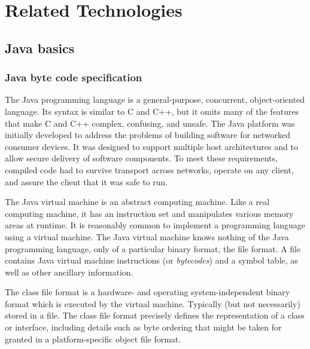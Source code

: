 \chapter{Related Technologies}


\section{Java basics}

\subsection{Java byte code specification}
The Java \cite{JavaSpec} programming language is a general-purpose, concurrent,
object-oriented language. Its syntax is similar to C and C++, but it omits many
of the features that make C and C++ complex, confusing, and unsafe. The Java
platform was initially developed to address the problems of building software
for networked consumer devices. It was designed to support multiple host
architectures and to allow secure delivery of software components. To meet these
requirements, compiled code had to survive transport across networks, operate on
any client, and assure the client that it was safe to run.

The Java virtual machine is an abstract computing machine. Like a real computing
machine, it has an instruction set and manipulates various memory areas at
runtime. It is reasonably common to implement a programming language using a
virtual machine. The Java virtual machine knows nothing of the Java programming
language, only of a particular binary format, the   file format. A
 file contains Java virtual machine instructions (or 
\emph{bytecodes}) and a symbol table, as well as other ancillary information.

The class file format is a hardware- and operating system-independent binary
format which is executed by the virtual machine. Typically (but not necessarily)
stored in a file. The class file format precisely defines the representation of a
class or interface, including details such as byte ordering that might be taken
for granted in a platform-specific object file format.

